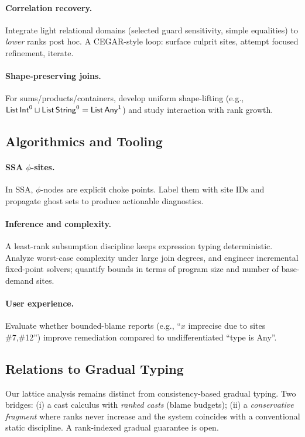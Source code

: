 \paragraph{Correlation recovery.}
Integrate light relational domains (selected guard sensitivity, simple equalities) to \emph{lower} ranks post hoc. A CEGAR-style loop: surface culprit sites, attempt focused refinement, iterate.

\paragraph{Shape-preserving joins.}
For sums/products/containers, develop uniform shape-lifting (e.g., $\mathsf{List}\,\mathsf{Int}^0 \sqcup \mathsf{List}\,\mathsf{String}^0 = \mathsf{List}\,\mathsf{Any}^{1}$) and study interaction with rank growth.

\subsection{Algorithmics and Tooling}
\paragraph{SSA $\phi$-sites.}
In SSA, $\phi$-nodes are explicit choke points. Label them with site IDs and propagate ghost sets to produce actionable diagnostics.

\paragraph{Inference and complexity.}
A least-rank subsumption discipline keeps expression typing deterministic. Analyze worst-case complexity under large join degrees, and engineer incremental fixed-point solvers; quantify bounds in terms of program size and number of base-demand sites.

\paragraph{User experience.}
Evaluate whether bounded-blame reports (e.g., “$x$ imprecise due to sites \#7,\#12”) improve remediation compared to undifferentiated ``type is Any''.

\subsection{Relations to Gradual Typing}
Our lattice analysis remains distinct from consistency-based gradual typing. Two bridges: (i) a cast calculus with \emph{ranked casts} (blame budgets); (ii) a \emph{conservative fragment} where ranks never increase and the system coincides with a conventional static discipline. A rank-indexed gradual guarantee is open.

